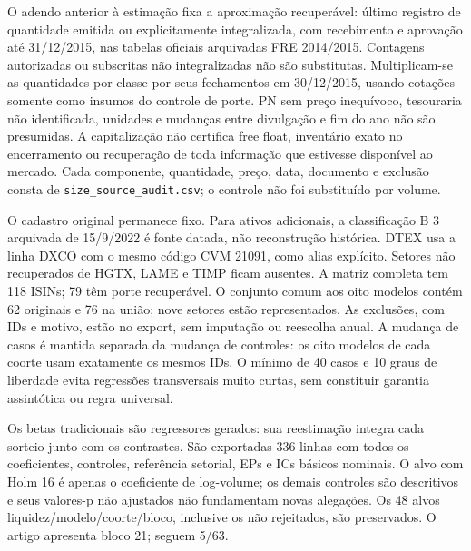 \documentclass[12 pt]{article}
\begin{document}
O adendo anterior à estimação fixa a aproximação recuperável: último
registro de quantidade emitida ou explicitamente integralizada, com
recebimento e aprovação até 31/12/2015, nas tabelas oficiais arquivadas
FRE 2014/2015. Contagens autorizadas ou subscritas não integralizadas
não são substitutas. Multiplicam-se as quantidades por classe por seus
fechamentos em 30/12/2015, usando cotações somente como insumos do
controle de porte. PN sem preço inequívoco, tesouraria não identificada,
unidades e mudanças entre divulgação e fim do ano não são presumidas.
A capitalização não certifica free float, inventário exato no encerramento
ou recuperação de toda informação que estivesse disponível ao mercado.
Cada componente, quantidade, preço, data, documento e exclusão consta de
\texttt{size\_source\_audit.csv}; o controle não foi substituído por volume.

O cadastro original permanece fixo. Para ativos adicionais, a classificação
B 3 arquivada de 15/9/2022 é fonte datada, não reconstrução histórica.
DTEX usa a linha DXCO com o mesmo código CVM 21091, como alias explícito.
Setores não recuperados de HGTX, LAME e TIMP ficam ausentes. A matriz
completa tem 118 ISINs; 79 têm porte recuperável. O conjunto comum aos oito
modelos contém 62 originais e 76 na união; nove setores estão representados.
As exclusões, com IDs e motivo, estão no export, sem imputação ou
reescolha anual. A mudança de casos é mantida separada da mudança de
controles: os oito modelos de cada coorte usam exatamente os mesmos IDs.
O mínimo de 40 casos e 10 graus de liberdade evita regressões transversais
muito curtas, sem constituir garantia assintótica ou regra universal.

Os betas tradicionais são regressores gerados: sua reestimação integra
cada sorteio junto com os contrastes. São exportadas 336 linhas com todos
os coeficientes, controles, referência setorial, EPs e ICs básicos nominais.
O alvo com Holm 16 é apenas o coeficiente de log-volume; os demais controles
são descritivos e seus valores-p não ajustados não fundamentam novas
alegações. Os 48 alvos liquidez/modelo/coorte/bloco, inclusive os não
rejeitados, são preservados. O artigo apresenta bloco 21; seguem 5/63.
\begin{table}[htbp]\centering\scriptsize
\caption{Controles de porte, setor e beta, bloco 5. ICs nominais; Holm 16 por
bloco, com 62/76 casos comuns. Não se seleciona o bloco pela significância.}

\end{table}
\begin{table}[htbp]\centering\scriptsize
\caption{Mesmos modelos, bloco 63; oito especificações em duas coortes.}

\end{table}
\end{document}
